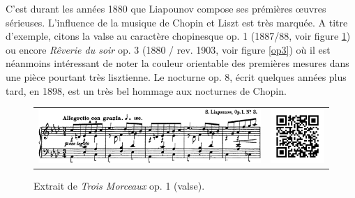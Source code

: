 C'est durant les années 1880 que Liapounov compose ses prémières œuvres sérieuses. L'influence de la musique de Chopin et Liszt est très marquée. A titre d'exemple, citons la valse au caractère chopinesque op. 1 (1887/88, voir figure \ref{op1}) ou encore \emph{Rêverie du soir} op. 3 (1880 / rev. 1903, voir figure \ref{op3}) où il est néanmoins intéressant de noter la couleur orientable des premières mesures dans une pièce pourtant très lisztienne. Le nocturne op. 8, écrit quelques années plus tard, en 1898, est un très bel hommage aux nocturnes de Chopin.

\begin{figure}[!ht]
  \begin{bigcenter}
    \begin{tabular}{lr}
      \includegraphics[width=12.5cm, keepaspectratio]{op1.png}
      &
      \includegraphics[width=3cm, keepaspectratio]{op1-qr.png}
    \end{tabular}
  \end{bigcenter}
  \caption{\label{op1}Extrait de \emph{Trois Morceaux} op. 1  (valse).}
\end{figure}

